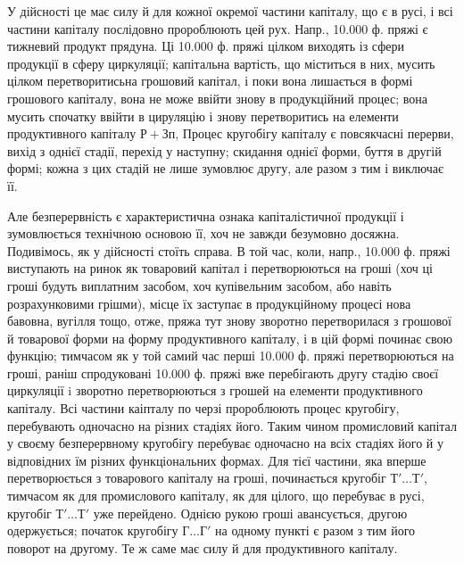 У дійсності це має силу й для кожної окремої частини капіталу,
що є в русі, і всі частини капіталу послідовно пророблюють цей рух.
Напр., 10.000 ф. пряжі є тижневий продукт прядуна. Ці 10.000 ф.
пряжі цілком виходять із сфери продукції в сферу циркуляції; капітальна
вартість, що міститься в них, мусить цілком перетворитисьна грошовий капітал,
і поки вона лишається в формі грошового капіталу, вона не може ввійти
знову в продукційний процес; вона мусить спочатку ввійти в цируляцію
і знову перетворитись на елементи продуктивного капіталу $Р + Зп$, Процес
кругобігу капіталу є повсякчасні перерви, вихід з однієї стадії, перехід
у наступну; скидання однієї форми, буття в другій формі; кожна з цих
стадій не лише зумовлює другу, але разом з тим і виключає її.

Але безперервність є характеристична ознака капіталістичної продукції
і зумовлюється технічною основою її, хоч не завжди безумовно досяжна.
Подивімось, як у дійсності стоїть справа. В той час, коли, напр., 10.000 ф.
пряжі виступають на ринок як товаровий капітал і перетворюються на
гроші (хоч ці гроші будуть виплатним засобом, хоч купівельним
засобом, або навіть розрахунковими грішми), місце їх заступає в продукційному
процесі нова бавовна, вугілля тощо, отже, пряжа тут знову
зворотно перетворилася з грошової й товарової форми на форму продуктивного
капіталу, і в цій формі починає свою функцію; тимчасом як у
той самий час перші 10.000 ф. пряжі перетворюються на гроші, раніш спродуковані
10.000 ф. пряжі вже перебігають другу стадію своєї циркуляції
i зворотно перетворюються з грошей на елементи продуктивного капіталу.
Всі частини каіпталу по черзі пророблюють процес кругобігу, перебувають
одночасно на різних стадіях його. Таким чином промисловий капітал
у своєму безперервному кругобігу перебуває одночасно на всіх стадіях
його й у відповідних їм різних функціональних формах. Для тієї частини,
яка вперше перетворюється з товарового капіталу на гроші, починається
кругобіг $Т'\dots{} Т'$, тимчасом як для промислового капіталу, як для цілого,
що перебуває в русі, кругобіг $Т'\dots{} Т'$ уже перейдено. Однією рукою гроші
авансується, другою одержується; початок кругобігу $Г\dots{} Г'$ на одному
пункті є разом з тим його поворот на другому. Те ж саме має силу
й для продуктивного капіталу.

